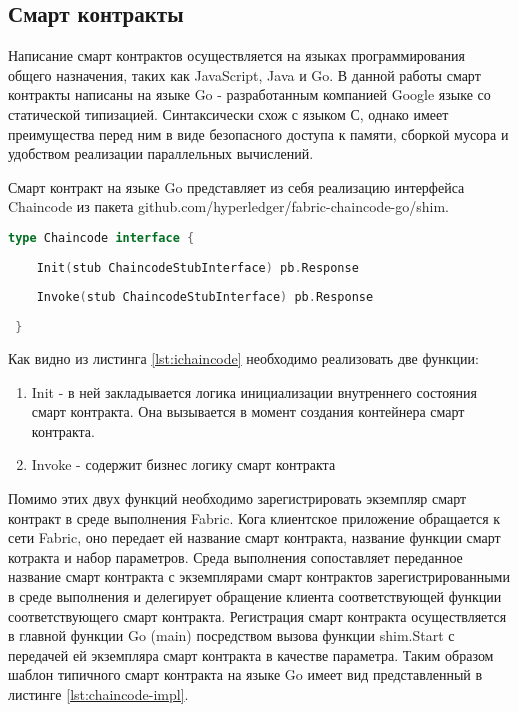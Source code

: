 \subsection{Смарт контракты} \label{subsec:ch2/sec3/subsec2}

Написание смарт контрактов осуществляется на языках программирования общего назначения, таких как JavaScript, Java и Go. В данной работы смарт контракты написаны на языке Go - разработанным компанией Google языке со статической типизацией. Синтаксически схож с  языком С, однако имеет преимущества перед ним в виде безопасного доступа к памяти, сборкой мусора и удобством реализации параллельных вычислений.

Смарт контракт на языке Go представляет из себя реализацию интерфейса Chaincode из пакета github.com/hyperledger/fabric-chaincode-go/shim.
 
\begin{lstlisting}[caption={Интерфейс Chaincode},label={lst:ichaincode},language=Go]
 type Chaincode interface {
 	
 	Init(stub ChaincodeStubInterface) pb.Response
 
 	Invoke(stub ChaincodeStubInterface) pb.Response
 	
 }
\end{lstlisting}
 
Как видно из листинга \ref{lst:ichaincode} необходимо реализовать две функции: 

\begin{enumerate}
	\item Init - в ней закладывается логика инициализации внутреннего состояния смарт контракта. Она вызывается в момент создания контейнера смарт контракта.
	\item Invoke - содержит бизнес логику смарт контракта
\end{enumerate}

Помимо этих двух функций необходимо зарегистрировать экземпляр  смарт контракт в среде выполнения Fabric. Кога клиентское приложение обращается к сети Fabric, оно передает ей название смарт контракта, название функции смарт котракта и набор параметров. Среда выполнения сопоставляет переданное название смарт контракта с экземплярами смарт контрактов зарегистрированными в среде выполнения и делегирует обращение клиента соответствующей функции соответствующего смарт контракта. Регистрация смарт контракта осуществляется в главной функции Go (main) посредством вызова функции shim.Start с передачей ей экземпляра смарт контракта в качестве параметра. Таким образом шаблон типичного смарт контракта на языке Go имеет вид представленный в листинге \ref{lst:chaincode-impl}.

